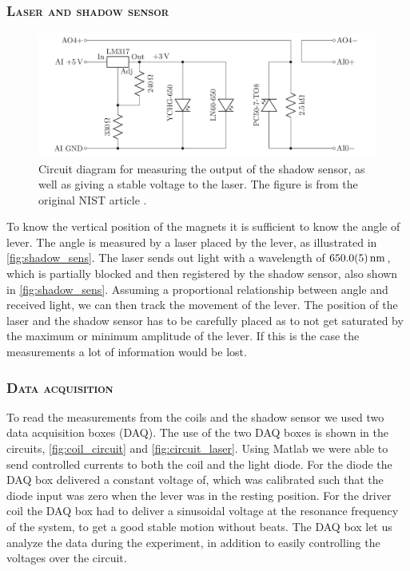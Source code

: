 \documentclass[english,a4paper,12pt,reprint]{revtex4-1}
\begin{document}
\subsubsection{\textsc{Laser and shadow sensor}}

\begin{figure}
  \centering
  \includegraphics[scale=0.30]{laser_shadow_circuit.png}
  \caption{Circuit diagram for measuring the output of the shadow sensor, as well as giving a stable voltage to the laser. The figure is from the original NIST article \cite{chao_lego_2015}.}
  \label{fig:circuit_laser}
\end{figure}

To know the vertical position of the magnets it is sufficient to know the angle of lever. The angle is measured by a laser placed by the lever, as illustrated in \cref{fig:shadow_sens}. The laser sends out light with a wavelength of $\SI{650.0\pm0.5}{\nano\meter}$, which is partially blocked and then registered by the shadow sensor, also shown in \cref{fig:shadow_sens}. Assuming a proportional relationship between angle and received light, we can then track the movement of the lever. The position of the laser and the shadow sensor has to be carefully placed as to not get saturated by the maximum or minimum amplitude of the lever. If this is the case the measurements a lot of information would be lost.

\subsubsection{\textsc{Data acquisition}}
To read the measurements from the coils and the shadow sensor we used two data acquisition boxes (DAQ). The use of the two DAQ boxes is shown in the circuits, \vref{fig:coil_circuit} and \vref{fig:circuit_laser}. Using Matlab we were able to send controlled currents to both the coil and the light diode. For the diode the DAQ box delivered a constant voltage of, which was calibrated such that the diode input was zero when the lever was in the resting position. For the driver coil the DAQ box had to deliver a sinusoidal voltage at the resonance frequency of the system, to get a good stable motion without beats. The DAQ box let us analyze the data during the experiment, in addition to easily controlling the voltages over the circuit.
\end{document}
